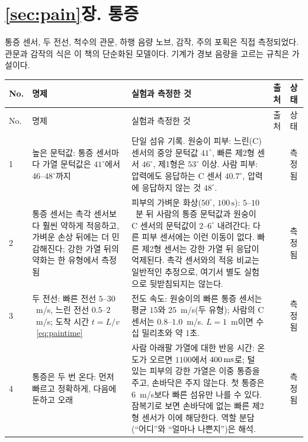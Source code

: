 \section{\ref{sec:pain}장. 통증}

통증 센서, 두 전선, 척수의 관문, 하행 음량 노브, 감작, 주의 포획은 직접 측정되었다. 관문과 감작의 식은 이 책의 단순화된 모델이다. 기계가 경보 음량을 고르는 규칙은 가설이다.

{\footnotesize
\setlength{\tabcolsep}{3pt}\renewcommand{\arraystretch}{1.15}
\begin{longtable}{>{\raggedright}p{0.5cm}>{\raggedright}p{4.0cm}>{\raggedright}p{5.6cm}>{\raggedright}p{2.3cm}>{\raggedright\arraybackslash}p{1.7cm}}
\toprule
No. & 명제 & 실험과 측정한 것 & 출처 & 상태 \\
\midrule\endfirsthead
\toprule
No. & 명제 & 실험과 측정한 것 & 출처 & 상태 \\
\midrule\endhead
1 & 높은 문턱값: 통증 센서마다 가열 문턱값은 $41^\circ$에서 $46$--$48^\circ$까지 & 단일 섬유 기록. 원숭이 피부: 느린(C) 센서의 중앙 문턱값 $41^\circ$, 빠른 제2형 센서 $46^\circ$, 제1형은 $53^\circ$ 이상. 사람 피부: 압력에도 응답하는 C 센서 $40.7^\circ$, 압력에 응답하지 않는 것 $48^\circ$. & \cite{Treede1995heat, Weidner1999cfib} & 측정됨 \\
2 & 통증 센서는 촉각 센서보다 훨씬 약하게 적응하고, 가벼운 손상 뒤에는 더 민감해진다; 강한 가열 뒤의 약화는 한 유형에서 측정됨 & 피부의 가벼운 화상($50^\circ$, $100\,\text{s}$): $5$--$10$~분 뒤 사람의 통증 문턱값과 원숭이 C 센서의 문턱값이 $2$--$6^\circ$ 내려간다; 다른 피부 센서에는 이런 이동이 없다. 빠른 제2형 센서는 강한 가열 뒤 응답이 억제된다. 촉각 센서와의 적응 비교는 일반적인 추정으로, 여기서 별도 실험으로 뒷받침되지는 않는다. & \cite{LaMotte1982hyper, Treede1995heat} & 측정됨 \\
3 & 두 전선: 빠른 전선 $5$--$30$~m/s, 느린 전선 $0.5$--$2$~m/s; 도착 시간 $t=L/v$~\eqref{eq:paintime} & 전도 속도: 원숭이의 빠른 통증 센서는 평균 $15$와 $25$~m/s(두 유형); 사람의 C 센서는 $0.8$--$1.0$~m/s. $L=1$~m이면 수십 밀리초와 약 1초. & \cite{Treede1995heat, Weidner1999cfib} & 측정됨 \\
4 & 통증은 두 번 온다: 먼저 빠르고 정확하게, 다음에 둔하고 오래 & 사람 아래팔 가열에 대한 반응 시간: 온도가 오르면 $1100$에서 $400\,\text{ms}$로; 털 있는 피부의 강한 가열은 이중 통증을 주고, 손바닥은 주지 않는다. 첫 통증은 $6$~m/s보다 빠른 섬유만 나를 수 있다. 잠복기로 보면 손바닥에 없는 빠른 제2형 센서가 이에 해당한다. 역할 분담(“어디”와 “얼마나 나쁜지”)은 해석. & \cite{CampbellLaMotte1983first, Treede1995heat} & 측정됨 \\

\end{longtable}}
